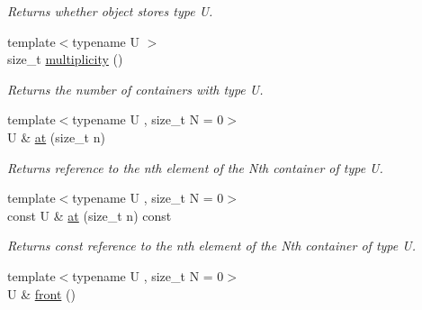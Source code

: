 \begin{DoxyCompactItemize}
\begin{DoxyCompactList}\small\item\em Returns whether object stores type U. \end{DoxyCompactList}\item 
\hypertarget{classheterogeneous_1_1heterodeque_3_01_t_00_01_types_8_8_8_4_a8531373eee7ac52ed2e0f24d46c96ffd}{}{\footnotesize template$<$typename U $>$ }\\size\+\_\+t \hyperlink{classheterogeneous_1_1heterodeque_3_01_t_00_01_types_8_8_8_4_a8531373eee7ac52ed2e0f24d46c96ffd}{multiplicity} ()\label{classheterogeneous_1_1heterodeque_3_01_t_00_01_types_8_8_8_4_a8531373eee7ac52ed2e0f24d46c96ffd}

\begin{DoxyCompactList}\small\item\em Returns the number of containers with type U. \end{DoxyCompactList}\item 
\hypertarget{classheterogeneous_1_1heterodeque_3_01_t_00_01_types_8_8_8_4_a9e7656a276605e21ede3c5a28bda4432}{}{\footnotesize template$<$typename U , size\+\_\+t N = 0$>$ }\\U \& \hyperlink{classheterogeneous_1_1heterodeque_3_01_t_00_01_types_8_8_8_4_a9e7656a276605e21ede3c5a28bda4432}{at} (size\+\_\+t n)\label{classheterogeneous_1_1heterodeque_3_01_t_00_01_types_8_8_8_4_a9e7656a276605e21ede3c5a28bda4432}

\begin{DoxyCompactList}\small\item\em Returns reference to the nth element of the Nth container of type U. \end{DoxyCompactList}\item 
\hypertarget{classheterogeneous_1_1heterodeque_3_01_t_00_01_types_8_8_8_4_a12404dca1adeca0c497d4e0203bdde3d}{}{\footnotesize template$<$typename U , size\+\_\+t N = 0$>$ }\\const U \& \hyperlink{classheterogeneous_1_1heterodeque_3_01_t_00_01_types_8_8_8_4_a12404dca1adeca0c497d4e0203bdde3d}{at} (size\+\_\+t n) const \label{classheterogeneous_1_1heterodeque_3_01_t_00_01_types_8_8_8_4_a12404dca1adeca0c497d4e0203bdde3d}

\begin{DoxyCompactList}\small\item\em Returns const reference to the nth element of the Nth container of type U. \end{DoxyCompactList}\item 
\hypertarget{classheterogeneous_1_1heterodeque_3_01_t_00_01_types_8_8_8_4_a38b45b962c13e7b5d4722ca6c66659da}{}{\footnotesize template$<$typename U , size\+\_\+t N = 0$>$ }\\U \& \hyperlink{classheterogeneous_1_1heterodeque_3_01_t_00_01_types_8_8_8_4_a38b45b962c13e7b5d4722ca6c66659da}{front} ()\label{classheterogeneous_1_1heterodeque_3_01_t_00_01_types_8_8_8_4_a38b45b962c13e7b5d4722ca6c66659da}


\end{DoxyCompactItemize}
